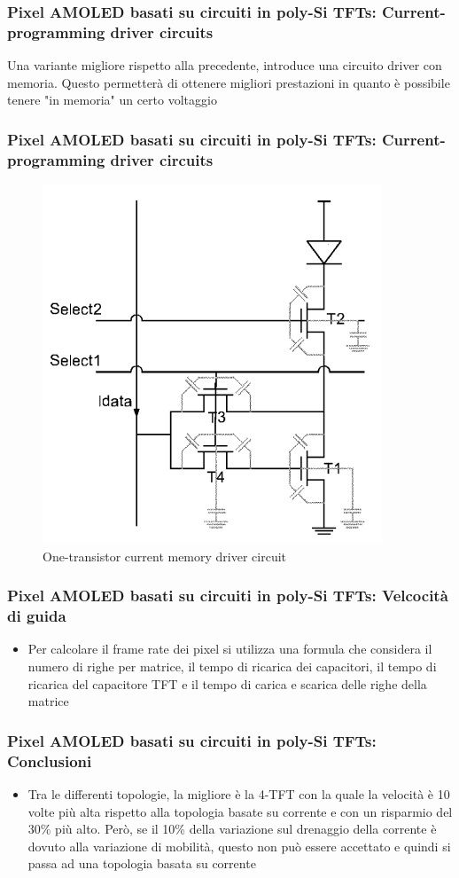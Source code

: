 \documentclass[12pt]{beamer}
\begin{document}
	\begin{frame}
		\frametitle{Pixel AMOLED basati su circuiti in poly-Si TFTs: Current-programming driver circuits}
		Una variante migliore rispetto alla precedente, introduce una circuito driver con memoria. Questo permetterà di ottenere migliori prestazioni in quanto è possibile tenere "in memoria" un certo voltaggio
	\end{frame}
	\begin{frame}
		\frametitle{Pixel AMOLED basati su circuiti in poly-Si TFTs: Current-programming driver circuits}
		\begin{figure}
			\centering
			\includegraphics[width=0.6\linewidth]{FISICA/one_tras_current}
			\caption{One-transistor current memory driver circuit}
			\label{fig:onetrascurrent}
		\end{figure}
	\end{frame}
	\begin{frame}
		\frametitle{Pixel AMOLED basati su circuiti in poly-Si TFTs: Velcocità di guida}
		\begin{itemize}
			\item Per calcolare il frame rate dei pixel	si utilizza una formula che considera il numero di righe per matrice, il tempo di ricarica dei capacitori, il tempo di ricarica del capacitore TFT e il tempo di carica e scarica delle righe della matrice
		\end{itemize}
	\end{frame}
	\begin{frame}
		\frametitle{Pixel AMOLED basati su circuiti in poly-Si TFTs: Conclusioni}
		\begin{itemize}
			\item Tra le differenti topologie, la migliore è la 4-TFT con la quale la velocità è 10 volte più alta rispetto alla
			topologia basate su corrente e con un risparmio del 30\% più alto. Però, se il 10\%
			della variazione sul drenaggio della corrente è dovuto alla variazione di mobilità,
			questo non può essere accettato e quindi si passa ad una topologia basata su
			corrente
		\end{itemize}
	\end{frame}
\end{document}
